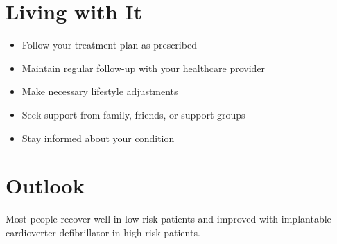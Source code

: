 \section{Living with It}
\begin{itemize}[noitemsep]
  \item Follow your treatment plan as prescribed
  \item Maintain regular follow-up with your healthcare provider
  \item Make necessary lifestyle adjustments
  \item Seek support from family, friends, or support groups
  \item Stay informed about your condition
\end{itemize}
\section{Outlook}
Most people recover well in low-risk patients and improved with implantable cardioverter-defibrillator in high-risk patients.
